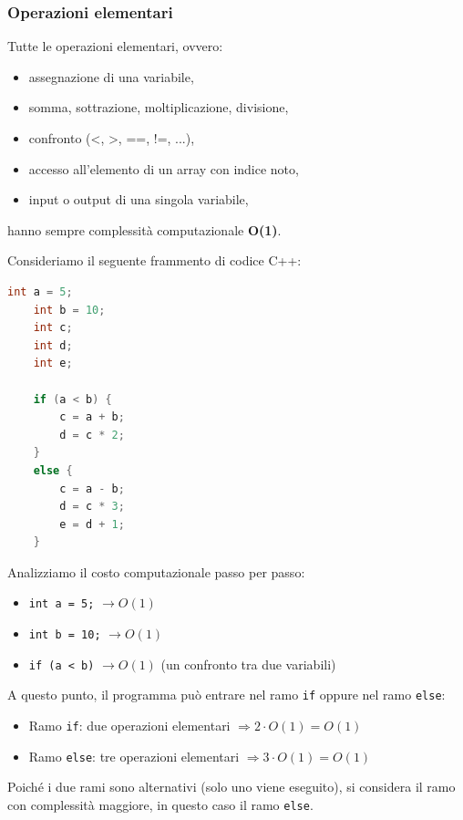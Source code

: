 \subsubsection{Operazioni elementari}

Tutte le operazioni elementari, ovvero:
\begin{itemize}
	\item assegnazione di una variabile,
	\item somma, sottrazione, moltiplicazione, divisione,
	\item confronto (<, >, ==, !=, ...),
	\item accesso all'elemento di un array con indice noto,
	\item input o output di una singola variabile,
\end{itemize}

hanno sempre complessità computazionale \textbf{O(1)}.

Consideriamo il seguente frammento di codice C++:

\begin{lstlisting}[language=C++]
	int a = 5;
	int b = 10;
	int c;
	int d;
	int e;
	
	if (a < b) {
		c = a + b;
		d = c * 2;
	} 
	else {
		c = a - b;
		d = c * 3;
		e = d + 1;
	}
\end{lstlisting}

Analizziamo il costo computazionale passo per passo:

\begin{itemize}
	\item \texttt{int a = 5;} $\rightarrow O(1)$  
	\item \texttt{int b = 10;} $\rightarrow O(1)$  
	\item \texttt{if (a < b)} $\rightarrow O(1)$ (un confronto tra due variabili)
\end{itemize}

A questo punto, il programma può entrare nel ramo \texttt{if} oppure nel ramo \texttt{else}:
\begin{itemize}
	\item Ramo \texttt{if}: due operazioni elementari  
	$\Rightarrow 2 \cdot O(1) = O(1)$
	\item Ramo \texttt{else}: tre operazioni elementari  
	$\Rightarrow 3 \cdot O(1) = O(1)$
\end{itemize}

Poiché i due rami sono alternativi (solo uno viene eseguito), si considera il ramo con complessità maggiore, in questo caso il ramo \texttt{else}.

